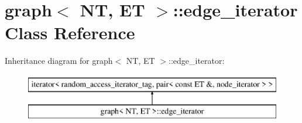 \hypertarget{classgraph_1_1edge__iterator}{\section{graph$<$ N\+T, E\+T $>$\+:\+:edge\+\_\+iterator Class Reference}
\label{classgraph_1_1edge__iterator}
}
Inheritance diagram for graph$<$ N\+T, E\+T $>$\+:\+:edge\+\_\+iterator\+:\begin{figure}[H]
\begin{center}
\leavevmode
\includegraphics[height=2.000000cm]{classgraph_1_1edge__iterator}
\end{center}
\end{figure}
